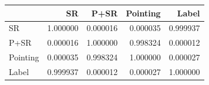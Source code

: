 \begin{tabular}{lrrrr}
\toprule
 & SR & P+SR & Pointing & Label \\
\midrule
SR & 1.000000 & 0.000016 & 0.000035 & 0.999937 \\
P+SR & 0.000016 & 1.000000 & 0.998324 & 0.000012 \\
Pointing & 0.000035 & 0.998324 & 1.000000 & 0.000027 \\
Label & 0.999937 & 0.000012 & 0.000027 & 1.000000 \\
\bottomrule
\end{tabular}
